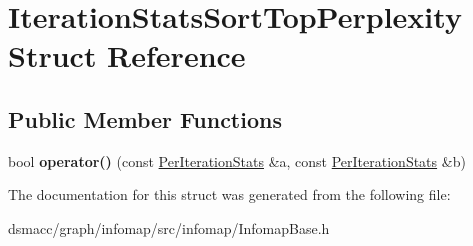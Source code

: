 \hypertarget{structIterationStatsSortTopPerplexity}{}\section{Iteration\+Stats\+Sort\+Top\+Perplexity Struct Reference}
\label{structIterationStatsSortTopPerplexity}
\subsection*{Public Member Functions}
\begin{DoxyCompactItemize}
\item 
\mbox{\label{structIterationStatsSortTopPerplexity_aa5069f86f633e96dde66685e58d9e13e}} 
bool {\bfseries operator()} (const \mbox{\hyperlink{structPerIterationStats}{Per\+Iteration\+Stats}} \&a, const \mbox{\hyperlink{structPerIterationStats}{Per\+Iteration\+Stats}} \&b)
\end{DoxyCompactItemize}


The documentation for this struct was generated from the following file\+:\begin{DoxyCompactItemize}
\item 
dsmacc/graph/infomap/src/infomap/Infomap\+Base.\+h\end{DoxyCompactItemize}
